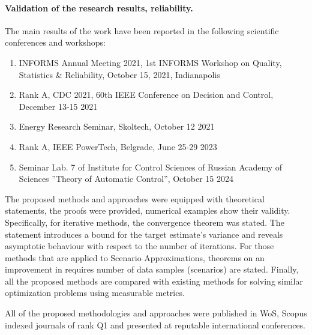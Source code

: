 \paragraph{Validation of the research results, reliability.}


The main results of the work have been reported in the following scientific conferences and workshops:

\begin{enumerate}
    \item INFORMS Annual Meeting 2021, 1st INFORMS Workshop on Quality, Statistics \& Reliability, October 15, 2021, Indianapolis
    \item Rank A, CDC 2021, 60th IEEE Conference on Decision and Control, December 13-15 2021
    \item Energy Research Seminar, Skoltech, October 12 2021
    \item Rank A, IEEE PowerTech, Belgrade, June 25-29 2023
    \item Seminar Lab. 7 of Institute for Control Sciences of Russian Academy of Sciences ''Theory of Automatic Control'', October 15 2024
\end{enumerate}

The proposed methods and approaches were equipped with theoretical statements, the proofs were provided, numerical examples show their validity. Specifically, for iterative methods, the convergence theorem was stated. The statement introduces a bound for the target estimate's variance and reveals asymptotic behaviour with respect to the number of iterations. For those methods that are applied to Scenario Approximations, theorems on an improvement in requires number of data samples (scenarios) are stated. Finally, all the proposed methods are compared with existing methods for solving similar optimization problems using measurable metrics. 

All of the proposed methodologies and approaches were published in WoS, Scopus indexed journals of rank Q1 and presented at reputable international conferences.

